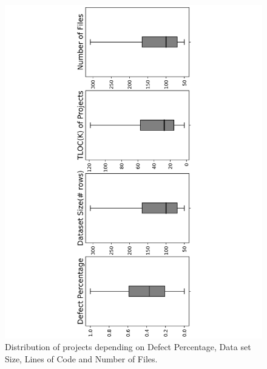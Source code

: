 \documentclass[10pt,journal,compsoc]{IEEEtran}
\begin{document}
\begin{figure}[!t]
\vspace{-15mm}
    \includegraphics[angle=270,width=\linewidth]{figs/meta.pdf}
    \vspace{-15mm}
    \caption{Distribution of projects depending on Defect Percentage, Data set Size, Lines of Code and Number of Files.} 
    \label{fig:meta}
\end{figure}
 
\end{document}
